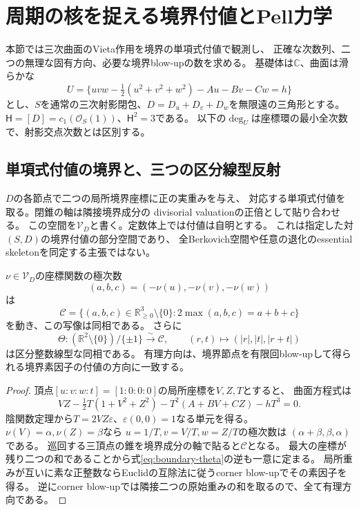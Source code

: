 \section{周期の核を捉える境界付値とPell力学}
\label{sec:boundary-pell-dynamics}
本節では三次曲面のVieta作用を境界の単項式付値で観測し、
正確な次数列、二つの無理な固有方向、必要な境界blow-upの数を求める。
基礎体は$\mathbb C$、曲面は滑らかな
\[
 U=\{uvw-\tfrac12(u^2+v^2+w^2)-Au-Bv-Cw=h\}
\]
とし、$S$を通常の三次射影閉包、$D=D_u+D_v+D_w$を無限遠の三角形とする。
$\mathsf H=[D]=c_1(\mathcal O_S(1))$、$\mathsf H^2=3$である。
以下の$\deg_U$は座標環の最小全次数で、射影交点次数とは区別する。

\subsection{単項式付値の境界と、三つの区分線型反射}
$D$の各節点で二つの局所境界座標に正の実重みを与え、
対応する単項式付値を取る。閉錐の軸は隣接境界成分の
divisorial valuationの正倍として貼り合わせる。
この空間を$\mathcal V_D$と書く。定数体上では付値は自明とする。
これは指定した対$(S,D)$の境界付値の部分空間であり、
全Berkovich空間や任意の退化のessential skeletonを同定する主張ではない。

\begin{proposition}[境界付値の三角錐表示]
\label{prop:boundary-valuation-cone}
$\nu\in\mathcal V_D$の座標関数の極次数
\[
 (a,b,c)=(-\nu(u),-\nu(v),-\nu(w))
\]
は
\[
 \mathcal C=\{(a,b,c)\in\mathbb R_{\ge0}^3\setminus\{0\}:
                  2\max(a,b,c)=a+b+c\}
\]
を動き、この写像は同相である。
さらに
\begin{equation}\label{eq:boundary-theta}
 \Theta:(\mathbb R^2\setminus\{0\})/\{\pm1\}\xrightarrow{\sim}\mathcal C,
 \qquad (r,t)\longmapsto(|r|,|t|,|r+t|)
\end{equation}
は区分整数線型な同相である。
有理方向は、境界節点を有限回blow-upして得られる境界素因子の付値の方向に一致する。
\end{proposition}
\begin{proof}
頂点$[u:v:w:t]=[1:0:0:0]$の局所座標を$V,Z,T$とすると、
曲面方程式は
\[
 VZ-\tfrac12T(1+V^2+Z^2)-T^2(A+BV+CZ)-hT^3=0.
\]
陰関数定理から$T=2VZ\varepsilon$、$\varepsilon(0,0)=1$なる単元を得る。
$\nu(V)=\alpha,\nu(Z)=\beta$なら
$u=1/T,v=V/T,w=Z/T$の極次数は
$(\alpha+\beta,\beta,\alpha)$である。
巡回する三頂点の錐を境界成分の軸で貼ると$\mathcal C$となる。
最大の座標が残り二つの和であることから式\eqref{eq:boundary-theta}の逆も一意に定まる。
局所重みが互いに素な正整数ならEuclidの互除法に従うcorner blow-upでその素因子を得る。
逆にcorner blow-upでは隣接二つの原始重みの和を取るので、全て有理方向である。
\end{proof}

